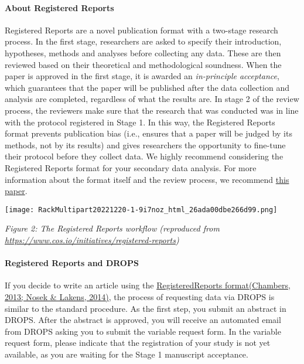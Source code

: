 \documentclass[
]{article}
\begin{document}
\hypertarget{about-registered-reports}{%
\paragraph{About Registered Reports}\label{about-registered-reports}}

Registered Reports are a novel publication format with a two-stage
research process. In the first stage, researchers are asked to specify
their introduction, hypotheses, methods and analyses before collecting
any data. These are then reviewed based on their theoretical and
methodological soundness. When the paper is approved in the first stage,
it is awarded an \emph{in-principle acceptance}, which guarantees that
the paper will be published after the data collection and analysis are
completed, regardless of what the results are. In stage 2 of the review
process, the reviewers make sure that the research that was conducted
was in line with the protocol registered in Stage 1. In this way, the
Registered Reports format prevents publication bias (i.e., ensures that
a paper will be judged by its methods, not by its results) and gives
researchers the opportunity to fine-tune their protocol before they
collect data. We highly recommend considering the Registered Reports
format for your secondary data analysis. For more information about the
format itself and the review process, we recommend
\href{https://www.nature.com/articles/s41562-021-01193-7}{this paper}.

\texttt{[image: RackMultipart20221220-1-9i7noz\_html\_26ada00dbe266d99.png]}

\emph{Figure 2: The Registered Reports workflow (reproduced from}
\href{https://www.cos.io/initiatives/registered-reports}{\emph{https://www.cos.io/initiatives/registered-reports}}\emph{)}

\hypertarget{registered-reports-and-drops}{%
\paragraph{Registered Reports and
DROPS}\label{registered-reports-and-drops}}

If you decide to write an article using the
\href{https://www.cos.io/initiatives/registered-reports}{Registered}\href{https://www.cos.io/initiatives/registered-reports}{Reports
format}\href{https://www.zotero.org/google-docs/?UK8wKf}{(Chambers,
20}\href{https://www.zotero.org/google-docs/?UK8wKf}{13}\href{https://www.zotero.org/google-docs/?UK8wKf}{;
Nosek \& Lakens, 2014)}, the process of requesting data via DROPS is
similar to the standard procedure. As the first step, you submit an
abstract in DROPS. After the abstract is approved, you will receive an
automated email from DROPS asking you to submit the variable request
form. In the variable request form, please indicate that the
registration of your study is not yet available, as you are waiting for
the Stage 1 manuscript acceptance.
\end{document}

